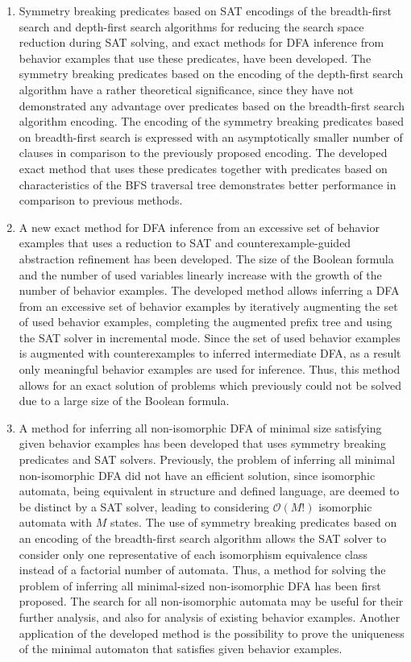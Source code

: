 
\begin{enumerate}
  \item Symmetry breaking predicates based on SAT encodings of the breadth-first search and depth-first search algorithms for reducing the search space reduction during SAT solving, and exact methods for DFA inference from behavior examples 
  that use these predicates, have been developed.
  The symmetry breaking predicates based on the encoding of the depth-first search algorithm have a rather theoretical
  significance, since they have not demonstrated any advantage over predicates based on the breadth-first search 
  algorithm encoding.
  The encoding of the symmetry breaking predicates based on breadth-first search is expressed with an asymptotically 
  smaller number of clauses in comparison to the previously proposed encoding.
  The developed exact method that uses these predicates together with predicates based on characteristics of the BFS traversal tree demonstrates better performance in comparison to previous methods.

  \item A new exact method for DFA inference from an excessive set of behavior examples that uses a reduction to SAT and counterexample-guided abstraction refinement has been developed.
  The size of the Boolean formula and the number of used variables linearly increase with the growth of the number of 
  behavior examples.
  The developed method allows inferring a DFA from an excessive set of behavior examples by iteratively augmenting
  the set of used behavior examples, completing the augmented prefix tree and using the SAT solver in incremental mode. 
  Since the set of used behavior examples is augmented with counterexamples to inferred intermediate DFA, as a result only 
  meaningful behavior examples are used for inference.
  Thus, this method allows for an exact solution of problems which previously could not be solved due to a large size of the Boolean formula.
  
  \item A method for inferring all non-isomorphic DFA of minimal size satisfying given behavior examples has been developed that uses symmetry breaking predicates and SAT solvers.
  Previously, the problem of inferring all minimal non-isomorphic DFA did not have an efficient solution, since
  isomorphic automata, being equivalent in structure and defined language, are deemed to be distinct by a SAT solver, leading to considering $\mathcal{O}\left(M!\right)$ isomorphic automata with $M$ states.
  The use of symmetry breaking predicates based on an encoding of the breadth-first search algorithm allows the SAT solver to consider only one representative of each isomorphism equivalence class instead of a factorial number of automata.
  Thus, a method for solving the problem of inferring all minimal-sized non-isomorphic DFA has been first proposed.
  The search for all non-isomorphic automata may be useful for their further analysis, and also for analysis of existing behavior examples.
  Another application of the developed method is the possibility to prove the uniqueness of the minimal automaton that 
  satisfies given behavior examples.
  

\end{enumerate}

